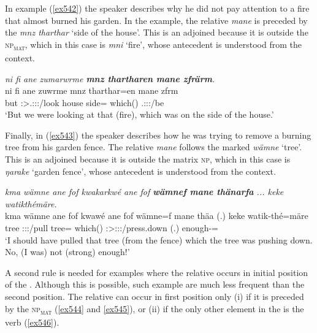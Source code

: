 In example (\ref{ex542}) the speaker describes why he did not pay attention to a fire that almost burned his garden. In the example, the relative  \emph{mane} is preceded by the  \emph{mnz tharthar} `side of the house'. This is an adjoined  because it is outside the \textsc{np}\textsubscript{\textsc{mat}}, which in this case is \emph{mni} `fire', whose antecedent is understood from the context.

\begin{exe}
	\ex \emph{ni fi ane zumarwrme \textbf{mnz thartharen mane zfrärm}.}\\
	\gll ni fi ane zuwrme mnz tharthar=en mane zfrm\\
	\Fnsg{} but \Dem{} \Fpl:\Sbj>\Tsg.\F:\Obj:\Pst:\Dur/look house side=\Loc{} which(\Abs) \Tsg.\F:\Sbj:\Pst:\Dur/be\\
	\trans `But we were looking at that (fire), which was on the side of the house.'\\
	\label{ex542}
\end{exe}

Finally, in (\ref{ex543}) the speaker describes how he was trying to remove a burning tree from his garden fence. The relative  \emph{mane} follows the  marked \emph{wämne} `tree'. This is an adjoined  because it is outside the matrix \textsc{np}, which in this case is \emph{ŋarake} `garden fence', whose antecedent is understood from the context.

\begin{exe}
	\ex \emph{kma wämne ane fof kwakarkwé ane fof \textbf{wämnef mane thänarfa} ... keke watikthémäre.}\\
	\gll kma wämne ane fof kwawé ane fof wämne=f mane thäa (.) keke watik-thé=märe\\
	\Pot{} tree \Dem{} \Emph{} \Fsg:\Sbj:\Rpst:\Ipfv/pull \Dem{} \Emph{} tree=\Erg{} which(\Abs) \Sg:\Sbj>\Stpl:\Obj:\Pst:\Ipfv/press.down (.) \Neg{} enough-\Adlzr=\Priv{}\\
	\trans `I should have pulled that tree (from the fence) which the tree was pushing down. No, (I was) not (strong) enough!'
	\label{ex543}
\end{exe}

A second rule is needed for examples where the relative  occurs in initial position of the . Although this is possible, such example are much less frequent than the second position. The relative  can occur in first position only (i) if it is preceded by the \textsc{np}\textsubscript{\textsc{mat}} (\ref{ex544} and \ref{ex545}), or (ii) if the only other element in the  is the verb (\ref{ex546}).


